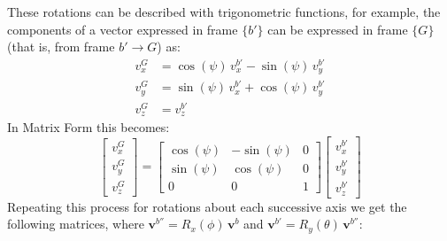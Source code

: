 \documentclass[conf]{new-aiaa}
\begin{document}


These rotations can be described with trigonometric functions, for example, the components of a vector expressed in frame $\{b'\}$ can be expressed in frame $\{G\}$ (that is, from frame $b' \xrightarrow{} G$) as:
\begin{align*}
    v^{G}_x &=\cos(\psi)\,v^{b'}_x-\sin(\psi)\,v^{b'}_y\\
    v^{G}_y &=  \sin(\psi)\,v^{b'}_x +\cos(\psi)\,v^{b'}_y \\
    v^{G}_z &= v^{b'}_z
\end{align*}
In  Matrix Form this becomes:
$$\begin{bmatrix}
    v^{G}_x\\v^{G}_y\\v^{G}_z
\end{bmatrix} = 
\begin{bmatrix}
    \cos(\psi) & -\sin(\psi) & 0\\
    \sin(\psi) & \cos(\psi) & 0\\
    0 & 0& 1
\end{bmatrix}\begin{bmatrix}
    v^{b'}_x\\v^{b'}_y\\v^{b'}_z
\end{bmatrix}$$
Repeating this process for rotations about each successive axis we get the following matrices, where $\mathbf{v}^{b''}=R_x(\phi)\,\mathbf{v}^{b}$ and $\mathbf{v}^{b'}=R_y(\theta)\,\mathbf{v}^{b''}$:
\end{document}
